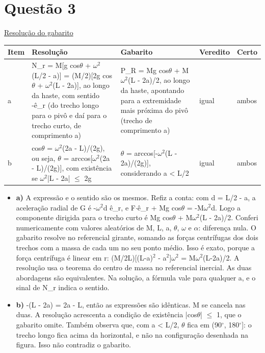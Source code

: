 \documentclass{article}%
\begin{document}
\section*{Questão 3}%
\href{https://poliedroresolve.sistemapoliedro.com.br/vestibulares/ita/2026/ita-2-fase-dia-3-30-10-2025-2-fase-dia-3/dissertativa-3-fisica-2-fase-dia-3-ita-2026}{Resolução do gabarito}\par\smallskip%
\begin{longtable}{@{}p{} p{} p{} p{} p{}@{}}\toprule Item & Resolução & Gabarito & Veredito & Certo \\ \midrule
a & N\_r = M{[}g cos$\theta$ + $\omega$$^2$(L/2 - a){]} = (M/2){[}2g cos$\theta$ + $\omega$$^2$(L - 2a){]}, ao longo da haste, com sentido -ê\_r (do trecho longo para o pivô e daí para o trecho curto, de comprimento a) & P\_R = Mg cos$\theta$ + M$\omega$$^2$(L - 2a)/2, ao longo da haste, apontando para a extremidade mais próxima do pivô (trecho de comprimento a) & igual & ambos \\
b & cos$\theta$ = $\omega$$^2$(2a - L)/(2g), ou seja, $\theta$ = arccos{[}$\omega$$^2$(2a - L)/(2g){]}, com existência se $\omega$$^2$|L - 2a| $\leq$ 2g & $\theta$ = arccos{[}-$\omega$$^2$(L - 2a)/(2g){]}, considerando a < L/2 & igual & ambos \\
\bottomrule\end{longtable}%
\begin{itemize}%
\item%
\textbf{a)} A expressão e o sentido são os mesmos. Refiz a conta: com d = L/2 - a, a aceleração radial de G é -$\omega$$^2$d ê\_r, e F$\cdot$ê\_r + Mg cos$\theta$ = -M$\omega$$^2$d. Logo a componente dirigida para o trecho curto é Mg cos$\theta$ + M$\omega$$^2$(L - 2a)/2. Conferi numericamente com valores aleatórios de M, L, a, $\theta$, $\omega$ e $\alpha$: diferença nula. O gabarito resolve no referencial girante, somando as forças centrífugas dos dois trechos com a massa de cada um no seu ponto médio. Isso é exato, porque a força centrífuga é linear em r: (M/2L){[}(L-a)$^2$ - a$^2${]}$\omega$$^2$ = M$\omega$$^2$(L-2a)/2. A resolução usa o teorema do centro de massa no referencial inercial. As duas abordagens são equivalentes. Na solução, a fórmula vale para qualquer a, e o sinal de N\_r indica o sentido.%
\item%
\textbf{b)} -(L - 2a) = 2a - L, então as expressões são idênticas. M se cancela nas duas. A resolução acrescenta a condição de existência |cos$\theta$| $\leq$ 1, que o gabarito omite. Também observa que, com a < L/2, $\theta$ fica em (90$^\circ$, 180$^\circ${]}: o trecho longo fica acima da horizontal, e não na configuração desenhada na figura. Isso não contradiz o gabarito.%
\end{itemize}%
\end{document}
